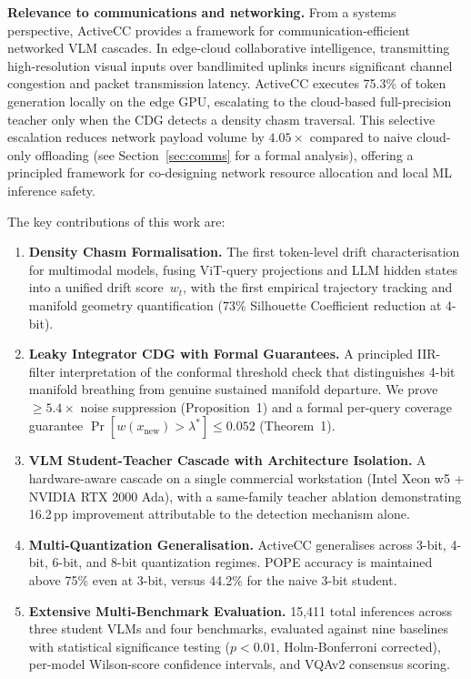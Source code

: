 \documentclass{ieeetmlcn}
\begin{document}
\textbf{Relevance to communications and networking.} From a systems
perspective, ActiveCC provides a framework for communication-efficient
networked VLM cascades. In edge-cloud collaborative intelligence,
transmitting high-resolution visual inputs over bandlimited uplinks
incurs significant channel congestion and packet transmission latency.
ActiveCC executes 75.3\% of token generation locally on the edge GPU,
escalating to the cloud-based full-precision teacher only when the CDG
detects a density chasm traversal. This selective escalation reduces
network payload volume by $4.05\times$ compared to naive cloud-only
offloading (see Section~\ref{sec:comms} for a formal analysis),
offering a principled framework for co-designing network resource
allocation and local ML inference safety.

The key contributions of this work are:
\begin{enumerate}
\item \textbf{Density Chasm Formalisation.} The first token-level drift
  characterisation for multimodal models, fusing ViT-query projections
  and LLM hidden states into a unified drift score~$w_t$,
  with the first empirical trajectory tracking and manifold geometry
  quantification ($73\%$ Silhouette Coefficient reduction at 4-bit).

\item \textbf{Leaky Integrator CDG with Formal Guarantees.} A principled
  IIR-filter interpretation of the conformal threshold check that
  distinguishes 4-bit manifold breathing from genuine sustained
  manifold departure. We prove $\geq 5.4\times$ noise suppression
  (Proposition~1) and a formal per-query coverage guarantee
  $\Pr[w(x_{\text{new}})>\lambda^*]\leq 0.052$ (Theorem~1).
\item \textbf{VLM Student-Teacher Cascade with Architecture Isolation.}
  A hardware-aware cascade on a single commercial workstation (Intel
  Xeon w5 + NVIDIA RTX 2000 Ada), with a same-family teacher ablation
  demonstrating 16.2\,pp improvement attributable to the detection
  mechanism alone.
\item \textbf{Multi-Quantization Generalisation.} ActiveCC generalises
  across 3-bit, 4-bit, 6-bit, and 8-bit quantization regimes. POPE
  accuracy is maintained above 75\% even at 3-bit, versus 44.2\% for
  the naive 3-bit student.
\item \textbf{Extensive Multi-Benchmark Evaluation.} 15,411 total inferences across three student VLMs and four benchmarks, evaluated against nine baselines with statistical significance testing ($p<0.01$, Holm-Bonferroni corrected), per-model Wilson-score confidence intervals, and VQAv2 consensus scoring.
\end{enumerate}
\end{document}
